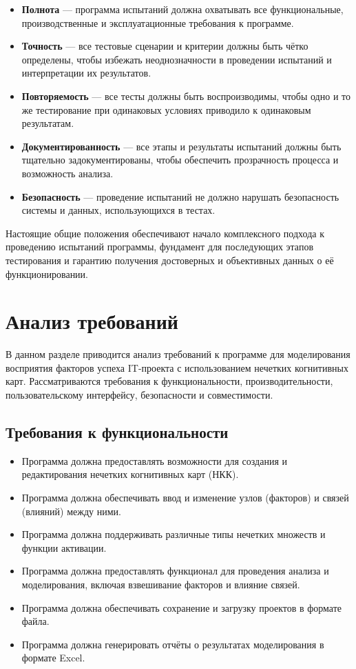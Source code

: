 \documentclass{article}
\begin{document}
    \begin{itemize}
        \item \textbf{Полнота} — программа испытаний должна охватывать все функциональные, производственные и эксплуатационные требования к программе.
        \item \textbf{Точность} — все тестовые сценарии и критерии должны быть чётко определены, чтобы избежать неоднозначности в проведении испытаний и интерпретации их результатов.
        \item \textbf{Повторяемость} — все тесты должны быть воспроизводимы, чтобы одно и то же тестирование при одинаковых условиях приводило к одинаковым результатам.
        \item \textbf{Документированность} — все этапы и результаты испытаний должны быть тщательно задокументированы, чтобы обеспечить прозрачность процесса и возможность анализа.
        \item \textbf{Безопасность} — проведение испытаний не должно нарушать безопасность системы и данных, использующихся в тестах.
    \end{itemize}

    Настоящие общие положения обеспечивают начало комплексного подхода к проведению испытаний программы, фундамент для последующих этапов тестирования и гарантию получения достоверных и объективных данных о её функционировании.
    \newpage
    \section{Анализ требований}
    В данном разделе приводится анализ требований к программе для моделирования восприятия факторов успеха IT-проекта с использованием нечетких когнитивных карт. Рассматриваются требования к функциональности, производительности, пользовательскому интерфейсу, безопасности и совместимости.

    \subsection{Требования к функциональности}

    \begin{itemize}
        \item Программа должна предоставлять возможности для создания и редактирования нечетких когнитивных карт (НКК).
        \item Программа должна обеспечивать ввод и изменение узлов (факторов) и связей (влияний) между ними.
        \item Программа должна поддерживать различные типы нечетких множеств и функции активации.
        \item Программа должна предоставлять функционал для проведения анализа и моделирования, включая взвешивание факторов и влияние связей.
        \item Программа должна обеспечивать сохранение и загрузку проектов в формате файла.
        \item Программа должна генерировать отчёты о результатах моделирования в формате Excel.
    \end{itemize}
\end{document}
